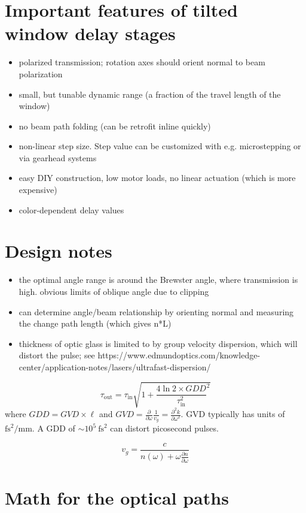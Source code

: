 \documentclass{report}
\begin{document}
\section{Important features of tilted window delay stages}
\begin{itemize}
    \item polarized transmission; rotation axes should orient normal to beam polarization
    \item small, but tunable dynamic range (a fraction of the travel length of the window)
    \item no beam path folding (can be retrofit inline quickly)
    \item non-linear step size.  Step value can be customized with e.g. microstepping or via gearhead systems
    \item easy DIY construction, low motor loads, no linear actuation (which is more expensive)
    \item color-dependent delay values
\end{itemize}

\section{Design notes}
\begin{itemize}
    \item the optimal angle range is around the Brewster angle, where transmission is high.  obvious limits of oblique angle due to clipping
    \item can determine angle/beam relationship by orienting normal and measuring the change path length (which gives n*L)
    \item thickness of optic glass is limited to by group velocity dispersion, which will distort the pulse; see https://www.edmundoptics.com/knowledge-center/application-notes/lasers/ultrafast-dispersion/
\end{itemize}

\begin{equation}\label{eq:pulse_broadening}
    \tau_\text{out} = \tau_\text{in} \sqrt{1 + \frac{4\ln{2} \times GDD}{\tau_\text{in}^2}^2}
\end{equation}
where $GDD=GVD \times \ell$ and $GVD=\frac{\partial}{\partial\omega} \frac{1}{v_g} = \frac{\partial^2 k}{\partial\omega^2}$.  GVD typically has units of $\text{fs}^2 / \text{mm}$.
A GDD of $\sim 10^5 \ \text{fs}^2$ can distort picosecond pulses.

\begin{equation}\label{eq:v_g}
    v_g = \frac{c}{n(\omega) + \omega \frac{\partial n}{\partial\omega}}
\end{equation}

\section{Math for the optical paths}
\end{document}
